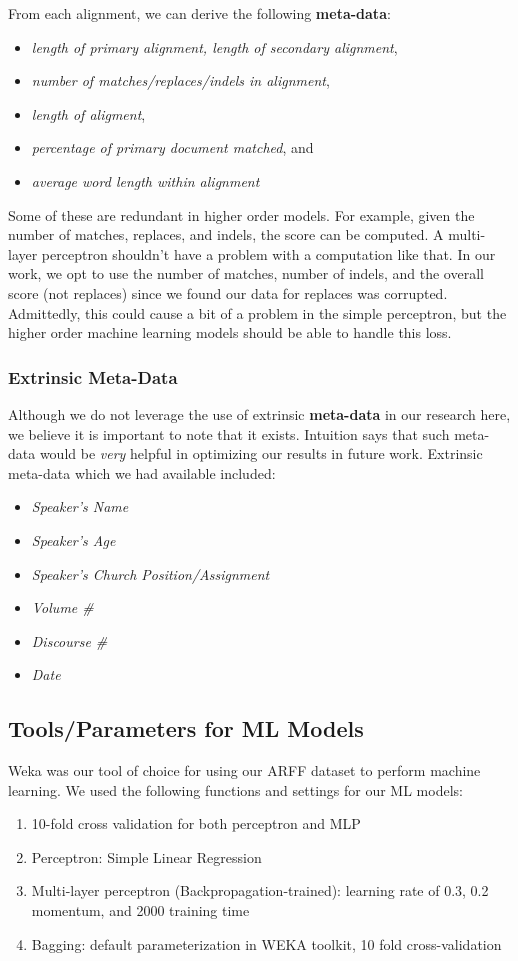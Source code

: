 From each alignment, we can derive the following \textbf{meta-data}:
	\begin{itemize}
		\item \textit{length of primary alignment, length of secondary alignment},
		\item \textit{number of matches/replaces/indels in alignment},
		\item \textit{length of aligment},
		\item \textit{percentage of primary document matched}, and
		\item \textit{average word length within alignment}
	\end{itemize}

Some of these are redundant in higher order models. For example, given the number of matches, replaces, and indels, the score can be computed. A multi-layer perceptron shouldn't have a problem with a computation like that. In our work, we opt to use the number of matches, number of indels, and the overall score (not replaces) since we found our data for replaces was corrupted. Admittedly, this could cause a bit of a problem in the simple perceptron, but the higher order machine learning models should be able to handle this loss.

\subsubsection{Extrinsic Meta-Data}
Although we do not leverage the use of extrinsic \textbf{meta-data} in our research here, we believe it is important to note that it exists. Intuition says that such meta-data would be \textit{very} helpful in optimizing our results in future work. Extrinsic meta-data which we had available included:
	\begin{itemize}
		\item \textit{Speaker's Name}
		\item \textit{Speaker's Age}
		\item \textit{Speaker's Church Position/Assignment}
		\item \textit{Volume \#}
		\item \textit{Discourse \#}
		\item \textit{Date}
	\end{itemize}

\subsection{Tools/Parameters for ML Models}
Weka \cite{weka_2009} was our tool of choice for using our ARFF dataset to perform machine learning. We used the following functions and settings for our ML models:
\begin{enumerate}
	\item 10-fold cross validation for both perceptron and MLP
	\item Perceptron: Simple Linear Regression
	\item Multi-layer perceptron (Backpropagation-trained): learning rate of 0.3, 0.2 momentum, and 2000 training time
	\item Bagging: default parameterization in WEKA toolkit, 10 fold cross-validation
\end{enumerate}

